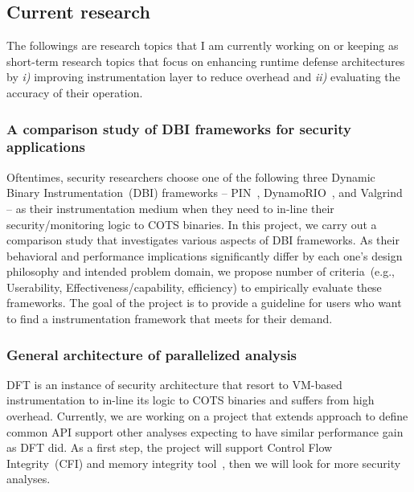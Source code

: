\documentclass[letterpaper, 10pt]{article}
\begin{document}
\begin{small}
\subsection*{Current research} %
%
%
The followings are research topics that I am currently working on or keeping as
short-term research topics that focus on enhancing runtime defense
architectures by {\it i)} improving instrumentation layer to reduce overhead
and {\it ii)} evaluating the accuracy of their operation. 


\subsubsection*{A comparison study of DBI frameworks for security applications}
%
Oftentimes, security researchers choose one of the following three Dynamic
Binary Instrumentation~(DBI) frameworks -- PIN~\cite{pin},
DynamoRIO~\cite{dynamo}, and Valgrind~\cite{valgrind} -- as their
instrumentation medium when they need to in-line their security/monitoring
logic to COTS binaries.
%
In this project, we carry out a comparison study that investigates various
aspects of DBI frameworks. As their behavioral and performance implications
significantly differ by each one's design philosophy and intended problem
domain, we propose number of criteria~(e.g., Userability,
Effectiveness/capability, efficiency) to empirically evaluate these frameworks.
%
The goal of the project is to provide a guideline for users who want to find a
instrumentation framework that meets for their demand.

\subsubsection*{General architecture of parallelized analysis} 
%
DFT is an instance of security architecture that resort to VM-based
instrumentation to in-line its logic to COTS binaries and suffers from high
overhead.
%
Currently, we are working on a project that extends \SR approach to define
common API support other analyses expecting to have similar performance gain as
DFT did. 
%
As a first step, the project will support Control Flow Integrity~(CFI) and
memory integrity tool~\cite{memcheck}, then we will look for more security
analyses.


\end{small}
\end{document}
